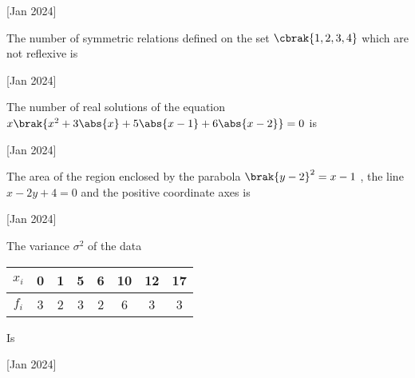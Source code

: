  \hfill[Jan 2024]

 \item The number of symmetric relations defined on the set $\cbrak{1,2,3,4}$
 which are not reflexive is 

 \hfill[Jan 2024]

 \item The number of real solutions of the equation $x\brak{x^2 + 3\abs{x} + 5\abs{x-1} + 6 \abs{x-2}} = 0$
 is 

 \hfill [Jan 2024]

 \item The area of the region enclosed by the parabola $\brak{y-2}^2 = x -1 $
, the line $x - 2y + 4 = 0$
 and the positive coordinate axes is

 \hfill [Jan 2024]

 \item The variance $\sigma^2 $ of the data
 \begin{table}[h!]
     \centering
     \begin{tabular}[12pt]{ |c| c| c|c|c|c|c|c|}
    \hline
    $x_i$ & 0 & 1 & 5 & 6 & 10 & 12 & 17 \\ 
    \hline
    $f_{i}$ & 3 & 2 & 3 & 2 & 6 & 3 & 3\\
    \hline 
    \end{tabular} 

 \end{table} 
 
 Is

 \hfill [Jan 2024]